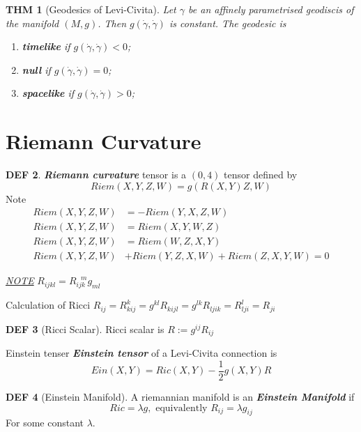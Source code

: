 \documentclass[twocolumn]{article}
\renewcommand{\emph}[1]{\textbf{\textit{#1}}}
\newcommand{\g}{\gamma}
\newcommand{\dg}{\dot{\gamma}}
\newcommand{\N}{\textit{\underline{NOTE} }}
\renewcommand{\dg}{\dot{\gamma}}
\newtheorem{thm}{THM}
\theoremstyle{definition}
\newtheorem{defi}[thm]{DEF}
\begin{document}
\begin{thm}[Geodesics of Levi-Civita]
	Let $\g$ be an affinely parametrised geodiscis of the manifold $(M, g)$.
	Then $g(\dg, \dg)$ is constant.
	The geodesic is 
	\begin{enumerate}
		\item \emph{timelike} if $g(\dg, \dg) < 0$;
		\item \emph{null} if $g(\dg, \dg) = 0$;
		\item \emph{spacelike} if $g(\dg, \dg) > 0$;
	\end{enumerate}
\end{thm}

\section{Riemann Curvature}
\begin{defi}
	\emph{Riemann curvature} tensor is a $(0, 4)$ tensor defined by 
	$$
	Riem(X, Y, Z, W) = g(R(X, Y)Z, W)
	$$
	Note 
	\begin{align*}
		Riem(X, Y, Z, W) &= -Riem(Y, X, Z, W) \\
		Riem(X, Y, Z, W) &= Riem(X, Y, W, Z) \\
		Riem(X, Y, Z, W) &= Riem(W, Z, X, Y) \\
		Riem(X, Y, Z, W) &+ Riem(Y, Z, X, W) + Riem(Z, X, Y, W) = 0
	\end{align*}
\end{defi}

\N $R_{ijkl} = R_{ijk}^{\ \ \ m} g_{ml}$

\begin{eg}{Calculation of Ricci}{}
	$R_{ij} = R_{kij}^k = g^{kl}R_{kijl} = g^{lk}R_{ljik} = R_{lji}^l = R_{ji} $ 
\end{eg}

\begin{defi}[Ricci Scalar]
	Ricci scalar is $R := g^{ij}R_{ij}$
\end{defi}

\begin{fdefi}{Einstein tenser}{}
	\emph{Einstein tensor} of a Levi-Civita connection is 
	$$
	Ein(X, Y) = Ric(X, Y) - \frac{1}{2}g(X, Y)R
	$$
\end{fdefi}

\begin{defi}[Einstein Manifold]
	A riemannian manifold is an \emph{Einstein Manifold} if 
	$$
	Ric = \lambda g, \text{ equivalently } R_{ij} = \lambda g_{ij}
	$$
	For some constant $\lambda$.
\end{defi}
\end{document}

